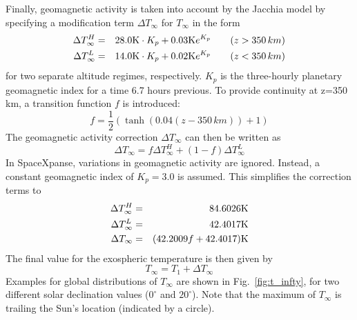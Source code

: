 \documentclass[a4paper]{article}
\begin{document}
Finally, geomagnetic activity is taken into account by the Jacchia model by specifying a modification term $\Delta T_\infty$ for $T_\infty$ in the form
\begin{eqnarray}
\Delta T^H_\infty &=& 28.0\mathrm{K} \cdot K_p + 0.03\mathrm{K} e^{K_p}\qquad (z > 350\,km) \\
\Delta T^L_\infty &=& 14.0\mathrm{K} \cdot K_p + 0.02\mathrm{K} e^{K_p}\qquad (z < 350\,km)
\end{eqnarray}
for two separate altitude regimes, respectively. $K_p$ is the three-hourly planetary geomagnetic index for a time 6.7 hours previous. To provide continuity at z=350\,km, a transition function $f$ is introduced:
\begin{equation}
f = \frac{1}{2} (\tanh(0.04 (z - 350\,km)) + 1)
\end{equation}
The geomagnetic activity correction $\Delta T_\infty$ can then be written as
\begin{equation}
\Delta T_\infty = f \Delta T^H_\infty + (1-f) \Delta T^L_\infty
\end{equation}
In SpaceXpanse, variations in geomagnetic activity are ignored. Instead, a constant geomagnetic index of $K_p = 3.0$ is assumed. This simplifies the correction terms to
\begin{eqnarray}
\Delta T^H_\infty &=& 84.6026\mathrm{K} \\
\Delta T^L_\infty &=& 42.4017\mathrm{K} \\
\Delta T_\infty &=& (42.2009 f + 42.4017)\mathrm{K}
\end{eqnarray}
The final value for the exospheric temperature is then given by
\begin{equation}
T_\infty = T_1 + \Delta T_\infty
\end{equation}
Examples for global distributions of $T_\infty$ are shown in Fig.~\ref{fig:t_infty}, for two different solar declination values ($0^\circ$ and $20^\circ$). Note that the maximum of $T_\infty$ is trailing the Sun's location (indicated by a circle).
\end{document}
